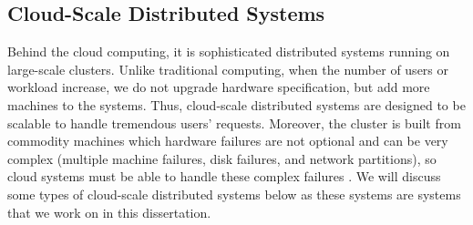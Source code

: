 \subsection{Cloud-Scale Distributed Systems}

Behind the cloud computing, it is sophisticated distributed systems running on
large-scale clusters. Unlike traditional computing, when the number of users or
workload increase, we do not upgrade hardware specification, but add more
machines to the systems. Thus, cloud-scale distributed systems are designed to
be scalable to handle tremendous users' requests. Moreover, the cluster is
built from commodity machines which hardware failures are not optional and can
be very complex (\eg multiple machine failures, disk failures, and network
partitions), so cloud systems must be able to handle these complex failures
\cite{Abadi09-Cloud, Gunawi+11-FaaS-TR, Hamilton07-Deploying}.  We will discuss
some types of cloud-scale distributed systems below as these systems are
systems that we work on in this dissertation.


